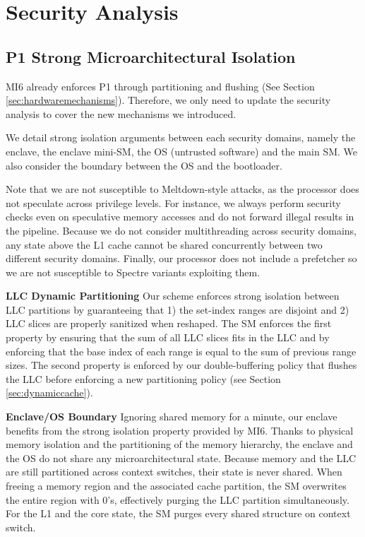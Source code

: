 \section{Security Analysis}
\label{sec:secannalysis}

\subsection{P1 Strong Microarchitectural Isolation}
MI6 already enforces P1 through partitioning and flushing 
(See Section \ref{sec:hardwaremechanisms}). 
Therefore, we only need to update the security analysis to cover the new mechanisms we introduced.

We detail strong isolation arguments between each security domains,
namely the enclave, the enclave mini-SM, the OS (untrusted software) and the main SM. We also consider the boundary between the OS and the bootloader.

Note that we are not susceptible to Meltdown-style attacks, as the processor does not speculate across privilege levels.
For instance, we always perform security checks even on speculative memory accesses and do not forward illegal results in the pipeline.
Because we do not consider multithreading across security domains, any state above the L1 cache cannot be shared concurrently between two different security domains.
Finally, our processor does not include a prefetcher so we are not susceptible to Spectre variants exploiting them.

\textbf{LLC Dynamic Partitioning}
Our scheme enforces strong isolation between LLC partitions by guaranteeing that 1) the set-index ranges are disjoint and 2) LLC slices are properly sanitized when reshaped.
The SM enforces the first property by ensuring that the sum of all LLC slices fits in the LLC and by enforcing that the base index of each range is equal to the sum of previous range sizes.
The second property is enforced by our double-buffering policy that flushes the LLC before enforcing a new partitioning policy (see Section \ref{sec:dynamiccache}).

\textbf{Enclave/OS Boundary}
Ignoring shared memory for a minute, our enclave benefits from the strong isolation property provided by MI6.
Thanks to physical memory isolation and the partitioning of the memory hierarchy, the enclave and the OS do not share any microarchitectural state.
Because memory and the LLC are still partitioned across context switches, their state is never shared.
When freeing a memory region and the associated cache partition, the SM overwrites the entire region with 0's, effectively purging the LLC partition simultaneously.
For the L1 and the core state, the SM purges every shared structure on context switch.

